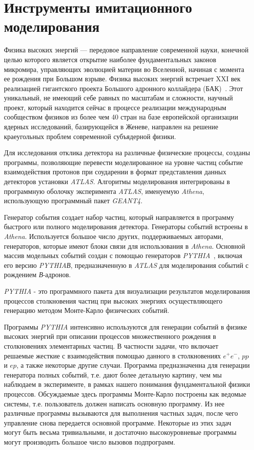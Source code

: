\section{Инструменты имитационного моделирования}

Физика высоких энергий — передовое направление современной науки, конечной целью которого является открытие наиболее фундаментальных законов микромира, управляющих эволюцией материи во Вселенной, начиная с момента ее рождения при Большом взрыве. Физика высоких энергий встречает XXI век реализацией гигантского проекта Большого адронного коллайдера (БАК)~\cite{2part-1}. Этот уникальный, не имеющий себе равных по масштабам и сложности, научный проект, который находится сейчас в процессе реализации международным сообществом физиков из более чем 40 стран на базе европейской организации ядерных исследований, базирующейся в Женеве, направлен на решение краеугольных проблем современной субъядерной физики.

Для исследования отклика детектора на различные физические процессы, созданы программы, позволяющие перевести моделированное на уровне частиц событие  взаимодействия протонов при соударении в формат представления данных детекторов установки \textit{ATLAS}. Алгоритмы моделирования интегрированы в программную оболочку эксперимента  \textit{ATLAS}, именуемую \textit{Athena}, использующую программный пакет \textit{GEANT4}.

Генератор события создает набор частиц, который направляется в программу быстрого или полного моделирования детектора. Генераторы событий встроены в \textit{Athena}. Используется большое число других, поддерживаемых авторами, генераторов, которые имеют блоки связи для использования в \textit{Athena}. Основной массив модельных событий создан с помощью генераторов \textit{PYTHIA}~\cite{2part-pythia-all}, включая его версию \textit{PYTHIAВ},  предназначенную в  \textit{ATLAS} для моделирования событий с рождением \textit{В}-адронов.

\textit{PYTHIA} - это программного пакета для визуализации результатов моделирования процессов столкновения частиц при высоких энергиях осуществляющего генерацию методом Монте-Карло физических событий.

Программы \textit{PYTHIA} интенсивно используются для генерации событий в физике высоких энергий при описании процессов множественного рождения в столкновениях элементарных частиц. В частности задачи, что включает решаемые жесткие с взаимодействия помощью данного в столкновениях $e^+e^-$, $pp$ и $ep$, а также некоторые другие случаи. Программа предназначенна для генерации генератора полных событий, т.е. дают более детальную картину, чем мы наблюдаем в эксперименте, в рамках нашего понимания фундаментальной физики процессов. Обсуждаемые здесь программы Монте-Карло построены как ведомые системы, т.е. пользователь должен написать основную программу. Из нее различные программы вызываются для выполнения частных задач, после чего управление снова передается основной программе. Некоторые из этих задач могут быть весьма тривиальными, и достаточно высокоуровневые программы могут производить большое число вызовов подпрограмм.

